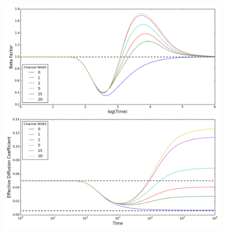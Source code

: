 	\begin{figure}[h]
		\centering
		\includegraphics[width=1.0\linewidth]{../images/2D/ye_beta_deff_2D}
		\caption{}
		\label{fig:ye_beta_deff_2D}
	\end{figure}

	